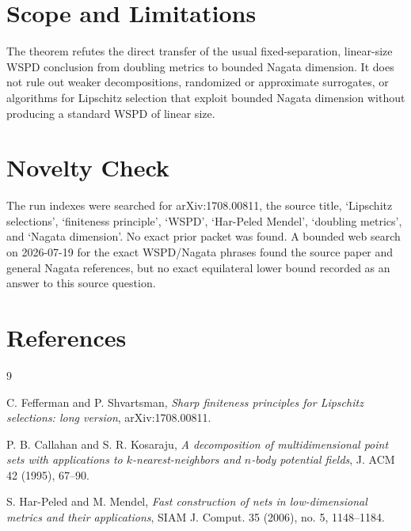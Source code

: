 \documentclass[11pt]{article}
\begin{document}
\section*{Scope and Limitations}

The theorem refutes the direct transfer of the usual fixed-separation,
linear-size WSPD conclusion from doubling metrics to bounded Nagata dimension.
It does not rule out weaker decompositions, randomized or approximate
surrogates, or algorithms for Lipschitz selection that exploit bounded Nagata
dimension without producing a standard WSPD of linear size.

\section*{Novelty Check}

The run indexes were searched for arXiv:1708.00811, the source title,
`Lipschitz selections', `finiteness principle', `WSPD', `Har-Peled Mendel',
`doubling metrics', and `Nagata dimension'. No exact prior packet was found.
A bounded web search on 2026-07-19 for the exact WSPD/Nagata phrases found the
source paper and general Nagata references, but no exact equilateral lower
bound recorded as an answer to this source question.

\section*{References}

\begin{thebibliography}{9}

C. Fefferman and P. Shvartsman,
\emph{Sharp finiteness principles for Lipschitz selections: long version},
arXiv:1708.00811.

P. B. Callahan and S. R. Kosaraju,
\emph{A decomposition of multidimensional point sets with applications to
\(k\)-nearest-neighbors and \(n\)-body potential fields},
J. ACM 42 (1995), 67--90.

S. Har-Peled and M. Mendel,
\emph{Fast construction of nets in low-dimensional metrics and their
applications},
SIAM J. Comput. 35 (2006), no. 5, 1148--1184.

\end{thebibliography}
\end{document}
